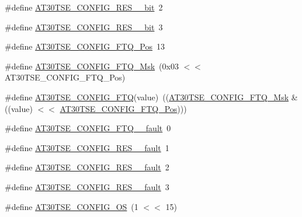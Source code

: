\begin{DoxyCompactItemize}
\#define \mbox{\hyperlink{group__asfdoc__sam0__at30tse75x__group_ga31556e6637deb2130dbc2b533a35f9d9}{A\+T30\+T\+S\+E\+\_\+\+C\+O\+N\+F\+I\+G\+\_\+\+R\+E\+S\+\_\+\_\+bit}}~2
\item 
\#define \mbox{\hyperlink{group__asfdoc__sam0__at30tse75x__group_ga6cbb4ff33aee4e6deb13422abdec1233}{A\+T30\+T\+S\+E\+\_\+\+C\+O\+N\+F\+I\+G\+\_\+\+R\+E\+S\+\_\+\_\+bit}}~3
\item 
\#define \mbox{\hyperlink{group__asfdoc__sam0__at30tse75x__group_ga8595f22c4a3580d296b0d159041ce447}{A\+T30\+T\+S\+E\+\_\+\+C\+O\+N\+F\+I\+G\+\_\+\+F\+T\+Q\+\_\+\+Pos}}~13
\item 
\#define \mbox{\hyperlink{group__asfdoc__sam0__at30tse75x__group_ga8c73ddfe3e58e3afe7f50b2b3559bc66}{A\+T30\+T\+S\+E\+\_\+\+C\+O\+N\+F\+I\+G\+\_\+\+F\+T\+Q\+\_\+\+Msk}}~(0x03 $<$$<$ A\+T30\+T\+S\+E\+\_\+\+C\+O\+N\+F\+I\+G\+\_\+\+F\+T\+Q\+\_\+\+Pos)
\item 
\#define \mbox{\hyperlink{group__asfdoc__sam0__at30tse75x__group_ga6293aa81435afcf8a68329b72803e0a7}{A\+T30\+T\+S\+E\+\_\+\+C\+O\+N\+F\+I\+G\+\_\+\+F\+TQ}}(value)~((\mbox{\hyperlink{group__asfdoc__sam0__at30tse75x__group_ga8c73ddfe3e58e3afe7f50b2b3559bc66}{A\+T30\+T\+S\+E\+\_\+\+C\+O\+N\+F\+I\+G\+\_\+\+F\+T\+Q\+\_\+\+Msk}} \& ((value) $<$$<$ \mbox{\hyperlink{group__asfdoc__sam0__at30tse75x__group_ga8595f22c4a3580d296b0d159041ce447}{A\+T30\+T\+S\+E\+\_\+\+C\+O\+N\+F\+I\+G\+\_\+\+F\+T\+Q\+\_\+\+Pos}})))
\item 
\#define \mbox{\hyperlink{group__asfdoc__sam0__at30tse75x__group_ga2b394c32c20643a08b236bc702ea40f4}{A\+T30\+T\+S\+E\+\_\+\+C\+O\+N\+F\+I\+G\+\_\+\+F\+T\+Q\+\_\+\_\+fault}}~0
\item 
\#define \mbox{\hyperlink{group__asfdoc__sam0__at30tse75x__group_ga271a3118e4ea11d43df2598f27daef0a}{A\+T30\+T\+S\+E\+\_\+\+C\+O\+N\+F\+I\+G\+\_\+\+R\+E\+S\+\_\+\_\+fault}}~1
\item 
\#define \mbox{\hyperlink{group__asfdoc__sam0__at30tse75x__group_ga56b8d704f34a546adc733d3587004128}{A\+T30\+T\+S\+E\+\_\+\+C\+O\+N\+F\+I\+G\+\_\+\+R\+E\+S\+\_\+\_\+fault}}~2
\item 
\#define \mbox{\hyperlink{group__asfdoc__sam0__at30tse75x__group_gadf4429af2c47d70bda424d6dae856725}{A\+T30\+T\+S\+E\+\_\+\+C\+O\+N\+F\+I\+G\+\_\+\+R\+E\+S\+\_\+\_\+fault}}~3
\item 
\#define \mbox{\hyperlink{group__asfdoc__sam0__at30tse75x__group_gadc1872fbf4ccc1693b2b2ee5be14cbbc}{A\+T30\+T\+S\+E\+\_\+\+C\+O\+N\+F\+I\+G\+\_\+\+OS}}~(1 $<$$<$ 15)
\item 
$$
\end{DoxyCompactItemize}
